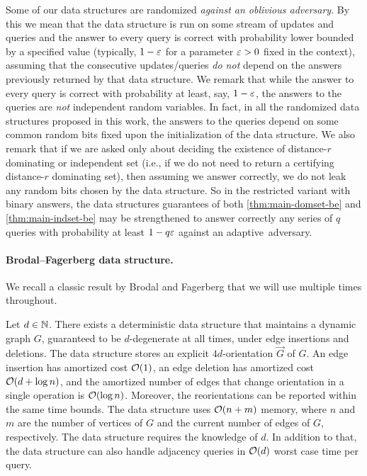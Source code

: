 Some of our data structures are randomized \emph{against an oblivious adversary}. By this we mean that the data structure is run on some stream of updates and queries and the answer to every query is correct with probability lower bounded by a specified value (typically, $1-\varepsilon$ for a parameter $\varepsilon>0$ fixed in the context), assuming that the consecutive updates/queries \emph{do not} depend on the answers previously returned by that data structure. We remark that while the answer to every query is correct with probability at least, say, $1-\varepsilon$, the answers to the queries are \emph{not} independent random variables. In fact, in all the randomized data structures proposed in this work, the answers to the queries depend on some common random bits fixed upon the initialization of the data structure. We also remark that if we are asked only about deciding the existence of distance-$r$ dominating or independent set (i.e., if we do not need to return a certifying distance-$r$ dominating set), then assuming we answer correctly, we do not leak any random bits chosen by the data structure. So in the restricted variant with binary answers, the data structures guarantees of both \cref{thm:main-domset-be} and \cref{thm:main-indset-be} may be strengthened to answer correctly any series of $q$ queries with probability at least $1-q\varepsilon$ against an adaptive~adversary.

\paragraph*{Brodal--Fagerberg data structure.}
We recall a classic result by Brodal and Fagerberg that we will use multiple times throughout.
\begin{theorem}\label{thm:bf}
	Let $d \in \mathbb{N}$. There exists a deterministic data structure that maintains a dynamic graph $G$, guaranteed to be $d$-degenerate at all times, under edge insertions and deletions.
	The data structure stores an explicit $4d$-orientation $\vec{G}$ of $G$.
	An edge insertion has amortized cost $\mathcal{O}(1)$, an edge deletion has amortized cost $\mathcal{O}(d + \log n)$, and the amortized number of edges that change orientation in a single operation is $\mathcal{O}(\log n)$. Moreover, the reorientations can be reported within the same time bounds.
	The data structure uses $\mathcal{O}(n + m)$ memory, where $n$ and $m$ are the number of vertices of $G$ and the current number of edges of $G$, respectively. The data structure requires the knowledge of $d$.
	In addition to that, the data structure can also handle adjacency queries in $\mathcal{O}(d)$ worst case time per query.
\end{theorem}


